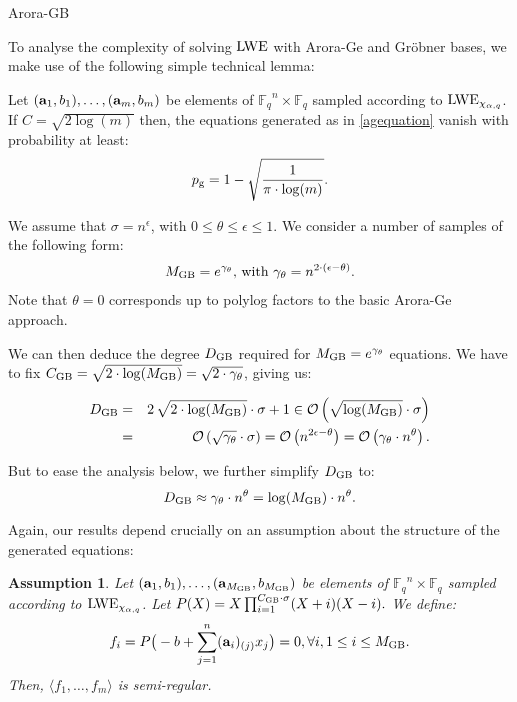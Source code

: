 \documentclass[10pt]{beamer}
\newcommand*{\neper}{e}
\newcommand{\bigO}[1]{\ensuremath{\mathcal{O}\left({#1}\right)}\xspace}
\newcommand{\Fq}{\ensuremath{\mathbb{F}_q}}
\newcommand\LWE{\ensuremath{{\rm LWE}}\xspace}
\def\DGB{D_{{\rm GB}}}
\def\MGB{M_{{\rm GB}}}
\def\CGB{C_{{\rm GB}}}
\newtheorem{assumption}{Assumption}
\begin{document}
\begin{frame}[allowframebreaks]{Arora-GB}

To analyse the complexity of solving \LWE with Arora-Ge and Gröbner bases, we make use of the following simple technical lemma:

\begin{lemma} \label{lemma_succ}
Let $({\bf a}_1,b_1),\ldots,({\bf a}_m,b_m)$ be elements of $\Fq^n \times \Fq$ sampled according  to $\LWE_{\chi_{\alpha,q}}$. 
If $C= \sqrt{2 \log(m)}$ then, the equations generated as in \eqref{agequation} vanish with probability at least:
$$
p_{\rm g}=1-\sqrt{\frac{1}{\pi \cdot \log(m)}}.
$$
\end{lemma} 

\framebreak

We assume that $\sigma = n^{\epsilon}$, with $0 \leq \theta  \leq  \epsilon \leq 1$.
We consider a number of samples of the following form:
\begin{eqnarray*}  \label{eq:num}
\MGB=e^{\gamma_{\theta}} \textnormal{, with } \gamma_{\theta}=n^{2\cdot (\epsilon-\theta)}.
\end{eqnarray*}
Note that $\theta=0$ corresponds up to polylog factors to the basic Arora-Ge approach.

\framebreak

We can then deduce the degree $\DGB$ required for  $\MGB=\neper^{\gamma_{\theta}}$ equations. We have to fix $\CGB=\sqrt{2 \cdot \log(\MGB)}=\sqrt{2 \cdot \gamma_{\theta}}$, giving us:

\begin{eqnarray*}
\DGB & = & 2 \, \sqrt{2 \cdot \log(\MGB)} \cdot \sigma+1 \in \bigO{\sqrt{\log(\MGB)} \cdot \sigma}\\
& =& \bigO{\sqrt{\gamma_{\theta}} \cdot \sigma} = \bigO{n ^{2\epsilon-\theta}}=\bigO{\gamma_{\theta} \cdot n ^{\theta}}.    
\end{eqnarray*}

But to ease the analysis below, we further simplify $\DGB$ to: 
$$
\DGB \approx \gamma_{\theta} \cdot n ^{\theta} = \log(\MGB)\cdot n ^{\theta}.
$$ 

\framebreak

Again, our results depend crucially on an assumption about the structure of the generated equations: 

\vspace{1em}

\begin{assumption}\label{ass:arora-ge}
Let $({\bf a}_1,b_1),\ldots,({\bf a}_{\MGB},b_{\MGB})$ be elements of $\Fq^n \times \Fq$ sampled according to $\LWE_{\chi_{\alpha,q}}$. Let $P(X)=X \prod_{i=1}^{\CGB \cdot \sigma}(X+i)(X-i).$ We define:
\begin{equation}\label{agequationb}
f_i=P\big(-b + \sum_{j=1}^{n} (\mathbf{a}_i)_{(j)}x_j\big)=0, \forall i, 1 \leq i \leq  \MGB.
\end{equation} 
Then,  $\langle f_1 ,\ldots,f_{m} \rangle$ is semi-regular. %
\end{assumption}


\end{frame}
\end{document}
